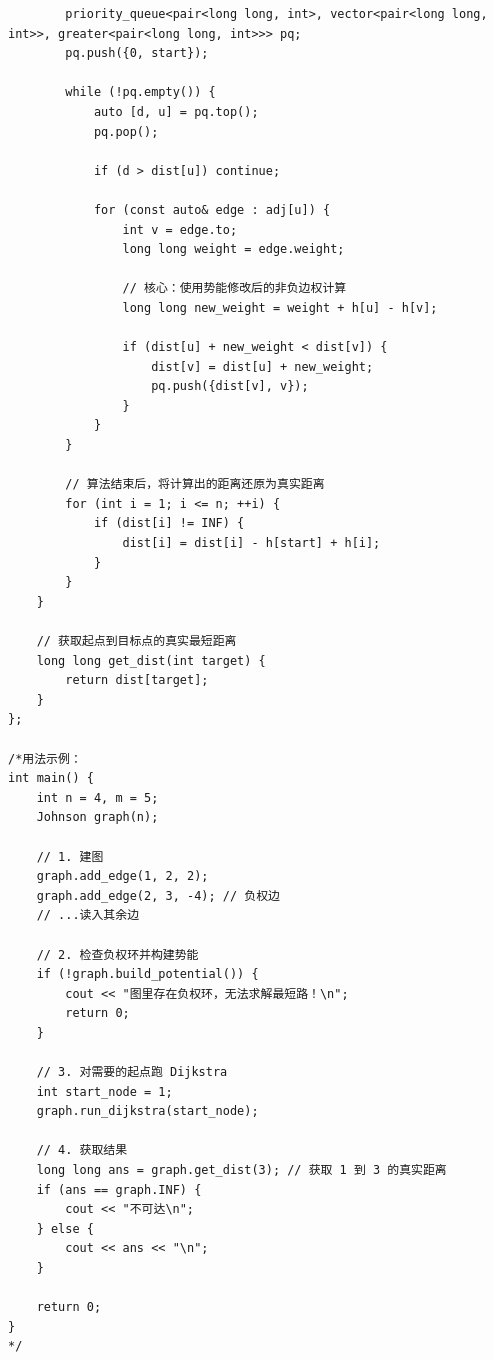 \documentclass[10pt, a4paper, twocolumn]{article} %
\begin{document}
\begin{lstlisting}
        priority_queue<pair<long long, int>, vector<pair<long long, int>>, greater<pair<long long, int>>> pq;
        pq.push({0, start});

        while (!pq.empty()) {
            auto [d, u] = pq.top();
            pq.pop();

            if (d > dist[u]) continue;

            for (const auto& edge : adj[u]) {
                int v = edge.to;
                long long weight = edge.weight;
                
                // 核心：使用势能修改后的非负边权计算
                long long new_weight = weight + h[u] - h[v];

                if (dist[u] + new_weight < dist[v]) {
                    dist[v] = dist[u] + new_weight;
                    pq.push({dist[v], v});
                }
            }
        }

        // 算法结束后，将计算出的距离还原为真实距离
        for (int i = 1; i <= n; ++i) {
            if (dist[i] != INF) {
                dist[i] = dist[i] - h[start] + h[i];
            }
        }
    }

    // 获取起点到目标点的真实最短距离
    long long get_dist(int target) {
        return dist[target];
    }
};

/*用法示例：
int main() {
    int n = 4, m = 5;
    Johnson graph(n);

    // 1. 建图
    graph.add_edge(1, 2, 2);
    graph.add_edge(2, 3, -4); // 负权边
    // ...读入其余边

    // 2. 检查负权环并构建势能
    if (!graph.build_potential()) {
        cout << "图里存在负权环，无法求解最短路！\n";
        return 0;
    }

    // 3. 对需要的起点跑 Dijkstra
    int start_node = 1;
    graph.run_dijkstra(start_node);

    // 4. 获取结果
    long long ans = graph.get_dist(3); // 获取 1 到 3 的真实距离
    if (ans == graph.INF) {
        cout << "不可达\n";
    } else {
        cout << ans << "\n";
    }

    return 0;
}
*/
    \end{lstlisting}
\end{document}
